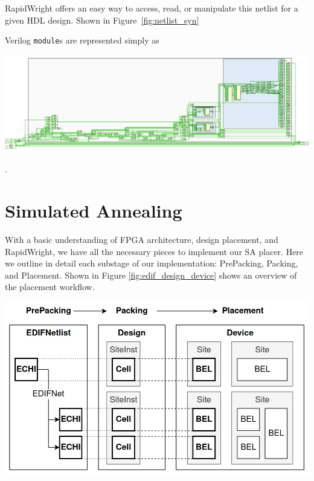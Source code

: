 \documentclass{article}
\begin{document}
    \begin{multicols}{2}



    RapidWright offers an easy way to access, read, or manipulate this netlist for a given HDL design. 
    Shown in Figure~\ref{fig:netlist_syn}

    Verilog \texttt{module}s are represented simply as

    \end{multicols}
    {
        \centering
        \includegraphics[width=\columnwidth]{figures/raw_edif.png}
        \label{fig:raw_edif}
    }
    \begin{multicols}{2}

    .

\newpage
\section{Simulated Annealing}
    \label{sec:simulated_annealing}
    With a basic understanding of FPGA architecture, design placement, and RapidWright, we have all the necessary pieces to implement our SA placer. 
    Here we outline in detail each substage of our implementation: PrePacking, Packing, and Placement. 
    Shown in Figure \ref{fig:edif_design_device} shows an overview of the placement workflow. 

    {
        \centering
        \includegraphics[width=0.9\columnwidth]{figures/edif_design_device.png}
        \label{fig:edif_design_device}
    }

    \end{multicols}
\end{document}
